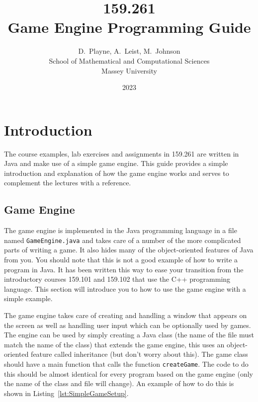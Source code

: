 \documentclass[a4paper, 10pt]{report}
\date{2023}
\title{\Huge {\bf 159.261 \\ Game Engine Programming Guide}}
\author{D.~Playne, A.~Leist, M.~Johnson \\ 
{\normalsize School of Mathematical and Computational Sciences}\\
{\normalsize Massey University}}
\begin{document}
\maketitle



\chapter{Introduction}

The course examples, lab exercises and assignments in 159.261 are written in Java and make use of a simple game engine. This guide provides a simple introduction and explanation of how the game engine works and serves to complement the lectures with a reference.


\section*{Game Engine}

The game engine is implemented in the Java programming language in a file named {\tt GameEngine.java} and takes care of a number of the more complicated parts of writing a game. It also hides many of the object-oriented features of Java from you. You should note that this is not a good example of how to write a program in Java. It has been written this way to ease your transition from the introductory courses 159.101 and 159.102 that use the C++ programming language. This section will introduce you to how to use the game engine with a simple example.

The game engine takes care of creating and handling a window that appears on the screen as well as handling user input which can be optionally used by games. The engine can be used by simply creating a Java class (the name of the file must match the name of the class) that extends the game engine, this uses an object-oriented feature called inheritance (but don't worry about this).  The game class should have a main function that calls the function {\tt createGame}. The code to do this should be almost identical for every program based on the game engine (only the name of the class and file will change). An example of how to do this is shown in Listing~\ref{lst:SimpleGameSetup}.
\end{document}
